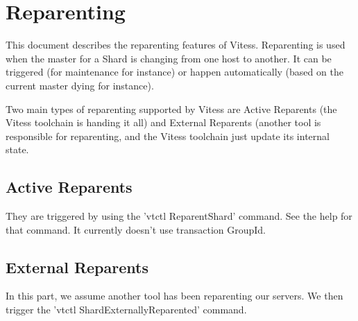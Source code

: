 \section{Reparenting}\label{Reparenting}

This document describes the reparenting features of Vitess. Reparenting is used when the master for a Shard is
changing from one host to another. It can be triggered (for maintenance for instance) or happen automatically
(based on the current master dying for instance).

Two main types of reparenting supported by Vitess are Active Reparents (the Vitess toolchain is handing it all)
and External Reparents (another tool is responsible for reparenting, and the Vitess toolchain just update its
internal state.

\subsection{Active Reparents}\label{active-reparents}

They are triggered by using the 'vtctl ReparentShard' command. See the help for that command. It currently doesn't use transaction GroupId.

\subsection{External Reparents}\label{external-reparents}

In this part, we assume another tool has been reparenting our servers. We then trigger the
'vtctl ShardExternallyReparented' command.

